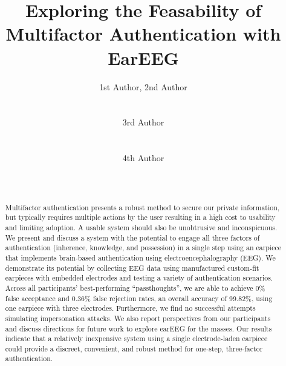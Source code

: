 \documentclass{sigchi}
\begin{document}
\title{Exploring the Feasability of\\ Multifactor Authentication with EarEEG}

\author{
  \alignauthor 1st Author, 2nd Author\\
    \\
    \\
  \alignauthor 3rd Author\\
    \\
    \\
  \alignauthor 4th Author\\
    \\
    \\
}

\maketitle

\begin{abstract}
Multifactor authentication presents a robust method to secure our private information, but typically requires multiple actions by the user resulting in a high cost to usability and limiting adoption. A usable system should also be unobtrusive and inconspicuous. We present and discuss a system with the potential to engage all three factors of authentication (inherence, knowledge, and possession) in a single step using an earpiece that implements brain-based authentication using electroencephalography (EEG). We demonstrate its potential by collecting EEG data using manufactured custom-fit earpieces with embedded electrodes and testing a variety of authentication scenarios. Across all participants’ best-performing “passthoughts”, we are able to achieve 0\% false acceptance and 0.36\% false rejection rates, an overall accuracy of 99.82\%, using one earpiece with three electrodes. Furthermore, we find no successful attempts simulating impersonation attacks. We also report perspectives from our participants and discuss directions for future work to explore earEEG for the masses. Our results indicate that a relatively inexpensive system using a single electrode-laden earpiece could provide a discreet, convenient, and robust method for one-step, three-factor authentication.

\end{abstract}

\end{document}
